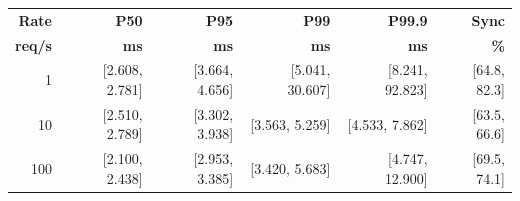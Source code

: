 \begin{tabular}{@{}rrrrrr@{}}
\toprule
\textbf{Rate} & \textbf{P50} & \textbf{P95} & \textbf{P99} & \textbf{P99.9} & \textbf{Sync} \\
\textbf{req/s} & \textbf{ms} & \textbf{ms} & \textbf{ms} & \textbf{ms} & \textbf{\%} \\
\midrule
1 & [2.608, 2.781] & [3.664, 4.656] & [5.041, 30.607] & [8.241, 92.823] & [64.8, 82.3] \\
10 & [2.510, 2.789] & [3.302, 3.938] & [3.563, 5.259] & [4.533, 7.862] & [63.5, 66.6] \\
100 & [2.100, 2.438] & [2.953, 3.385] & [3.420, 5.683] & [4.747, 12.900] & [69.5, 74.1] \\
\bottomrule
\end{tabular}
